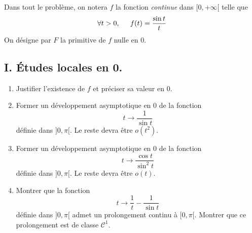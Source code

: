 Dans tout le problème, on notera $f$ la fonction \emph{continue} dans $[0,+\infty[$ telle que
\begin{displaymath}
  \forall t>0,\hspace{0.5cm} f(t) = \frac{\sin t}{t}
\end{displaymath}
On désigne par $F$ la primitive de $f$ nulle en $0$.

\subsection*{I. \'Etudes locales en 0.}
\begin{enumerate}
  \item Justifier l'existence de $f$ et préciser sa valeur en $0$.
  \item Former un développement asymptotique en $0$ de la fonction 
\begin{displaymath}
t\rightarrow \frac{1}{\sin t}  
\end{displaymath}
définie dans $]0,\pi[$. Le reste devra être $o(t^2)$.
  \item Former un développement asymptotique en $0$ de la fonction 
\begin{displaymath}
t\rightarrow \frac{\cos t}{\sin^2 t}  
\end{displaymath}  
  définie dans $]0,\pi[$. Le reste devra être $o(t)$.
  \item Montrer que la fonction
\begin{displaymath}
t\rightarrow \frac{1}{t} - \frac{1}{\sin t}  
\end{displaymath}
définie dans $]0,\pi[$ admet un prolongement continu à $[0,\pi[$. Montrer que ce prolongement est de classe $\mathcal{C}^1$.
\end{enumerate}

